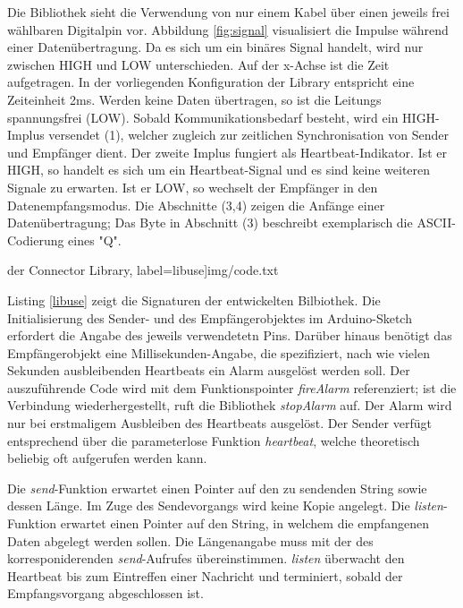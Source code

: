 \documentclass[a4paper, 11pt]{article}
\begin{document}
Die Bibliothek sieht die Verwendung von nur einem Kabel über einen jeweils frei wählbaren Digitalpin vor. Abbildung \ref{fig:signal} visualisiert die Impulse während einer Datenübertragung. Da es sich um ein binäres Signal handelt, wird nur zwischen HIGH und LOW unterschieden. Auf der x-Achse ist die Zeit aufgetragen. In der vorliegenden Konfiguration der Library entspricht eine Zeiteinheit 2ms. Werden keine Daten übertragen, so ist die Leitungs spannungsfrei (LOW). Sobald Kommunikationsbedarf besteht, wird ein HIGH-Implus versendet (1), welcher zugleich zur zeitlichen Synchronisation von Sender und Empfänger dient. Der zweite Implus fungiert als Heartbeat-Indikator. Ist er HIGH, so handelt es sich um ein Heartbeat-Signal und es sind keine weiteren Signale zu erwarten. Ist er LOW, so wechselt der Empfänger in den Datenempfangsmodus. Die Abschnitte (3,4) zeigen die Anfänge einer Datenübertragung; Das Byte in Abschnitt (3) beschreibt exemplarisch die ASCII-Codierung eines "Q". \newline

\noindent\begin{minipage}{\textwidth}
     der Connector Library, label=libuse]{img/code.txt}
\end{minipage}

Listing \ref{libuse} zeigt die Signaturen der entwickelten Bilbiothek. Die Initialisierung des Sender- und des Empfängerobjektes im Arduino-Sketch erfordert die Angabe des jeweils verwendetetn Pins. Darüber hinaus benötigt das Empfängerobjekt eine Millisekunden-Angabe, die spezifiziert, nach wie vielen Sekunden ausbleibenden Heartbeats ein Alarm ausgelöst werden soll. Der auszuführende Code wird mit dem Funktionspointer \textit{fireAlarm} referenziert; ist die Verbindung wiederhergestellt, ruft die Bibliothek  \textit{stopAlarm} auf. Der Alarm wird nur bei erstmaligem Ausbleiben des Heartbeats ausgelöst. Der Sender verfügt entsprechend über die parameterlose Funktion  \textit{heartbeat}, welche theoretisch beliebig oft aufgerufen werden kann.

Die  \textit{send}-Funktion erwartet einen Pointer auf den zu sendenden String sowie dessen Länge. Im Zuge des Sendevorgangs wird keine Kopie angelegt. Die  \textit{listen}-Funktion erwartet einen Pointer auf den String, in welchem die empfangenen Daten abgelegt werden sollen. Die Längenangabe muss mit der des korresponiderenden  \textit{send}-Aufrufes übereinstimmen. \textit{listen} überwacht den Heartbeat bis zum Eintreffen einer Nachricht und terminiert, sobald der Empfangsvorgang abgeschlossen ist.
\end{document}
